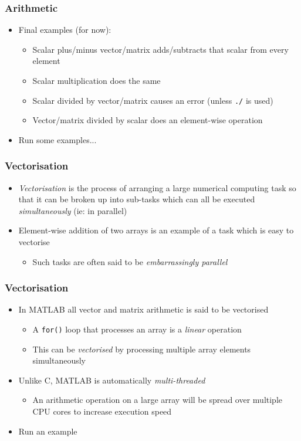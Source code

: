 \documentclass[14pt]{beamer}
\begin{document}
\begin{frame}
\frametitle{Arithmetic}
\begin{itemize}
\item Final examples (for now):
	\begin{itemize}
		\item Scalar plus/minus vector/matrix adds/subtracts that scalar from every element
		\item Scalar multiplication does the same
		\item Scalar divided by vector/matrix causes an error (unless \texttt{./} is used)
		\item Vector/matrix divided by scalar does an element-wise operation
	\end{itemize}
\item Run some examples...
\end{itemize}
\end{frame}

\begin{frame}
\frametitle{Vectorisation}
\begin{itemize}
\item \textit{Vectorisation} is the process of arranging a large numerical computing task so that it can be broken up into sub-tasks which can all be executed \textit{simultaneously} (ie: in parallel)
\pause
\item Element-wise addition of two arrays is an example of a task which is easy to vectorise
	\begin{itemize}
		\item Such tasks are often said to be \textit{embarrassingly parallel}
	\end{itemize}
\end{itemize}
\end{frame}

\begin{frame}
\frametitle{Vectorisation}
\begin{itemize}
\item In MATLAB all vector and matrix arithmetic is said to be vectorised
	\begin{itemize}
		\item A \texttt{for()} loop that processes an array is a \textit{linear} operation
		\item This can be \textit{vectorised} by processing multiple array elements simultaneously
	\end{itemize}
\pause
\item Unlike C, MATLAB is automatically \textit{multi-threaded}
	\begin{itemize}
		\item An arithmetic operation on a large array will be spread over multiple CPU cores to increase execution speed
	\end{itemize}
\item Run an example
\end{itemize}
\end{frame}
\end{document}
